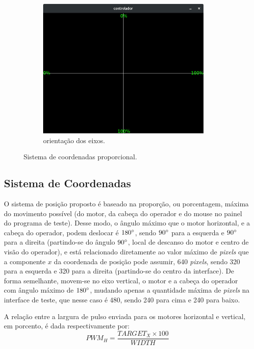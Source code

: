 \begin{figure}[H]
	\begin{subfigure}{.5\textwidth}
		\includegraphics[width=0.95\textwidth]{figuras/controlador-values.jpg}
		\caption{orientação dos eixos.}
		\label{fig:sistcoord}
	\end{subfigure}
	\caption{Sistema de coordenadas proporcional.}
\end{figure}

\subsection{Sistema de Coordenadas}
\label{subsec:sistemacoordenadas}

O sistema de posição proposto é baseado na proporção, ou porcentagem, máxima do movimento possível (do motor, da cabeça do operador e do mouse no painel do programa de teste). Desse modo, o ângulo máximo que o motor horizontal, e a cabeça do operador, podem deslocar é $180\degree$, sendo $90\degree$ para a esquerda e $90\degree$ para a direita (partindo-se do ângulo $90\degree$, local de descanso do motor e centro de visão do operador), e está relacionado diretamente ao valor máximo de \textit{pixels} que a componente $x$ da coordenada de posição pode assumir, 640 \textit{pixels}, sendo 320 para a esquerda e 320 para a direita (partindo-se do centro da interface). De forma semelhante, movem-se no eixo vertical, o motor e a cabeça do operador com ângulo máximo de $180\degree$, mudando apenas a quantidade máxima de \textit{pixels} na interface de teste, que nesse caso é 480, sendo 240 para cima e 240 para baixo.\par
A relação entre a largura de pulso enviada para os motores horizontal e vertical, em porcento, é dada respectivamente por:
\begin{equation}
	PWM_H = \frac{TARGET_X \times 100}{WIDTH}
	\label{eq:pwm_screen_h}
\end{equation}

